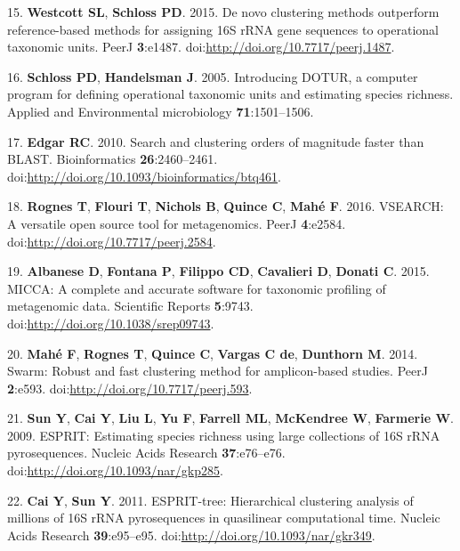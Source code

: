 \documentclass[11pt,]{article}
\begin{document}
15. \textbf{Westcott SL}, \textbf{Schloss PD}. 2015. De novo clustering
methods outperform reference-based methods for assigning 16S rRNA gene
sequences to operational taxonomic units. PeerJ \textbf{3}:e1487.
doi:\url{http://doi.org/10.7717/peerj.1487}.

16. \textbf{Schloss PD}, \textbf{Handelsman J}. 2005. Introducing DOTUR,
a computer program for defining operational taxonomic units and
estimating species richness. Applied and Environmental microbiology
\textbf{71}:1501--1506.

17. \textbf{Edgar RC}. 2010. Search and clustering orders of magnitude
faster than BLAST. Bioinformatics \textbf{26}:2460--2461.
doi:\url{http://doi.org/10.1093/bioinformatics/btq461}.

18. \textbf{Rognes T}, \textbf{Flouri T}, \textbf{Nichols B},
\textbf{Quince C}, \textbf{Mahé F}. 2016. VSEARCH: A versatile open
source tool for metagenomics. PeerJ \textbf{4}:e2584.
doi:\url{http://doi.org/10.7717/peerj.2584}.

19. \textbf{Albanese D}, \textbf{Fontana P}, \textbf{Filippo CD},
\textbf{Cavalieri D}, \textbf{Donati C}. 2015. MICCA: A complete and
accurate software for taxonomic profiling of metagenomic data.
Scientific Reports \textbf{5}:9743.
doi:\url{http://doi.org/10.1038/srep09743}.

20. \textbf{Mahé F}, \textbf{Rognes T}, \textbf{Quince C},
\textbf{Vargas C de}, \textbf{Dunthorn M}. 2014. Swarm: Robust and fast
clustering method for amplicon-based studies. PeerJ \textbf{2}:e593.
doi:\url{http://doi.org/10.7717/peerj.593}.

21. \textbf{Sun Y}, \textbf{Cai Y}, \textbf{Liu L}, \textbf{Yu F},
\textbf{Farrell ML}, \textbf{McKendree W}, \textbf{Farmerie W}. 2009.
ESPRIT: Estimating species richness using large collections of 16S rRNA
pyrosequences. Nucleic Acids Research \textbf{37}:e76--e76.
doi:\url{http://doi.org/10.1093/nar/gkp285}.

22. \textbf{Cai Y}, \textbf{Sun Y}. 2011. ESPRIT-tree: Hierarchical
clustering analysis of millions of 16S rRNA pyrosequences in quasilinear
computational time. Nucleic Acids Research \textbf{39}:e95--e95.
doi:\url{http://doi.org/10.1093/nar/gkr349}.
\end{document}
